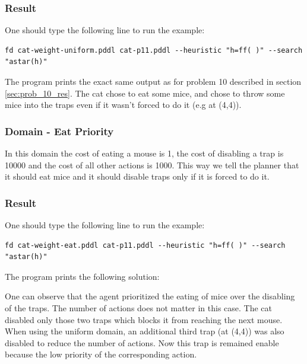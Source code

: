 \subsubsection{Result}

One should type the following line to run the example: 

\begin{lstlisting}[numbers=none]
fd cat-weight-uniform.pddl cat-p11.pddl --heuristic "h=ff( )" --search "astar(h)"
\end{lstlisting}

The program prints the exact same output as for problem 10 described in section \ref{sec:prob_10_res}. The cat chose to eat some mice, and chose to throw some mice into the traps even if it wasn't forced to do it (e.g at (4,4)). 




\subsubsection{Domain - Eat Priority}

In this domain the cost of eating a mouse is 1, the cost of disabling a trap is 10000 and the cost of all other actions is 1000. This way we tell the planner that it should eat mice and it should disable traps only if it is forced to do it.

\subsubsection{Result}

One should type the following line to run the example: 

\begin{lstlisting}[numbers=none]
fd cat-weight-eat.pddl cat-p11.pddl --heuristic "h=ff( )" --search "astar(h)"
\end{lstlisting}

The program prints the following solution:



One can observe that the agent prioritized the eating of mice over the disabling of the traps. The number of actions does not matter in this case. The cat disabled only those two traps which blocks it from reaching the next mouse. When using the uniform domain, an additional third trap (at (4,4)) was also disabled to reduce the number of actions. Now this trap is remained enable because the low priority of the corresponding action.  




